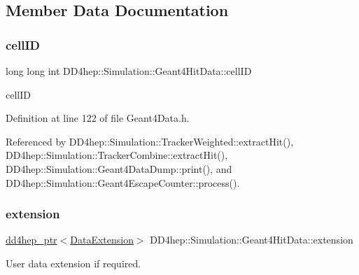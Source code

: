 \subsection{Member Data Documentation}
\hypertarget{class_d_d4hep_1_1_simulation_1_1_geant4_hit_data_a3ad003b720e4d7a1c6e66e0eabb58540}{}\label{class_d_d4hep_1_1_simulation_1_1_geant4_hit_data_a3ad003b720e4d7a1c6e66e0eabb58540} 
\subsubsection{\texorpdfstring{cell\+ID}{cellID}}
{\footnotesize\ttfamily long long int D\+D4hep\+::\+Simulation\+::\+Geant4\+Hit\+Data\+::cell\+ID}



cell\+ID 



Definition at line 122 of file Geant4\+Data.\+h.



Referenced by D\+D4hep\+::\+Simulation\+::\+Tracker\+Weighted\+::extract\+Hit(), D\+D4hep\+::\+Simulation\+::\+Tracker\+Combine\+::extract\+Hit(), D\+D4hep\+::\+Simulation\+::\+Geant4\+Data\+Dump\+::print(), and D\+D4hep\+::\+Simulation\+::\+Geant4\+Escape\+Counter\+::process().

\hypertarget{class_d_d4hep_1_1_simulation_1_1_geant4_hit_data_a56ce0428b9799cf18cab288a77c6e3c5}{}\label{class_d_d4hep_1_1_simulation_1_1_geant4_hit_data_a56ce0428b9799cf18cab288a77c6e3c5} 
\subsubsection{\texorpdfstring{extension}{extension}}
{\footnotesize\ttfamily \hyperlink{class_d_d4hep_1_1dd4hep__ptr}{dd4hep\+\_\+ptr}$<$\hyperlink{class_d_d4hep_1_1_simulation_1_1_data_extension}{Data\+Extension}$>$ D\+D4hep\+::\+Simulation\+::\+Geant4\+Hit\+Data\+::extension}



User data extension if required. 



